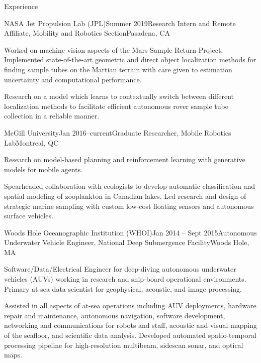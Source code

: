 \documentclass{resume} %
\begin{document}
\begin{rSection}{Experience}
\begin{rSubsection}{NASA Jet Propulsion Lab (JPL)}{Summer 2019}{Research Intern and Remote Affiliate, Mobility and Robotics Section}{Pasadena, CA}
\item{Worked on machine vision aspects of the Mars Sample Return Project. Implemented state-of-the-art geometric and direct object localization methods for finding sample tubes on the Martian terrain with care given to estimation uncertainty and computational performance.}
\item{Research on a model which learns to contextually switch between different localization methods to facilitate efficient autonomous rover sample tube collection in a reliable manner.}
\end{rSubsection}
	\vspace{-.2cm}
\begin{rSubsection}{McGill University}{Jan 2016--current}{Graduate Researcher, Mobile Robotics Lab}{Montreal, QC}
\item{Research on model-based planning and reinforcement learning with generative models for mobile agents.}
\item{Spearheaded collaboration with ecologists to develop automatic classification and spatial modeling of zooplankton in Canadian lakes. Led research and design of strategic marine sampling with custom low-cost floating sensors and autonomous surface vehicles.}
\end{rSubsection}
	\vspace{-.2cm}
\begin{rSubsection}{Woods Hole Oceanographic Institution (WHOI)}{Jan 2014 -- Sept 2015}{Autonomous Underwater Vehicle Engineer, National Deep Submergence Facility}{Woods Hole, MA}
\item{Software/Data/Electrical Engineer for deep-diving autonomous underwater vehicles (AUVs) working in research and ship-board operational environments. Primary at-sea data scientist for geophysical, acoustic, and image processing.}
\item{Assisted in all aspects of at-sea operations including AUV deployments, hardware repair and maintenance, autonomous navigation, software development, networking and communications for robots and staff, acoustic and visual mapping of the seafloor, and scientific data analysis. Developed automated spatio-temporal processing pipeline for high-resolution multibeam, sidescan sonar, and optical maps.}

\end{rSubsection}
\end{rSection}
\end{document}
